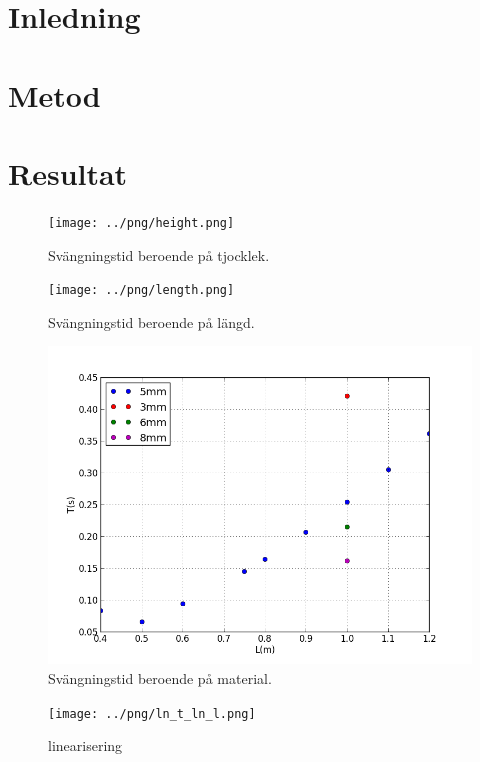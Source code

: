 \documentclass[10pt, titlepage, oneside, a4paper]{article}
\begin{document}
    
	\section{Inledning}
	\section{Metod}
	\section{Resultat}
    \begin{center}
        \begin{figure}[h]
            \centering
            \texttt{[image: ../png/height.png]}
            \caption{Svängningstid beroende på tjocklek.}
            \label{height}
        \end{figure}
        \begin{figure}
            \centering
            \texttt{[image: ../png/length.png]}
            \caption{Svängningstid beroende på längd.}
            \label{length}
        \end{figure}
        \begin{figure}
            \centering
            \includegraphics[scale=.5]{../png/plot.png}
            \caption{Svängningstid beroende på material.}
            \label{material}
        \end{figure}
        \begin{figure}
            \centering
            \texttt{[image: ../png/ln\_t\_ln\_l.png]}
            \caption{linearisering}
            \label{linearisering}
        \end{figure}
    \end{center}
\end{document}

